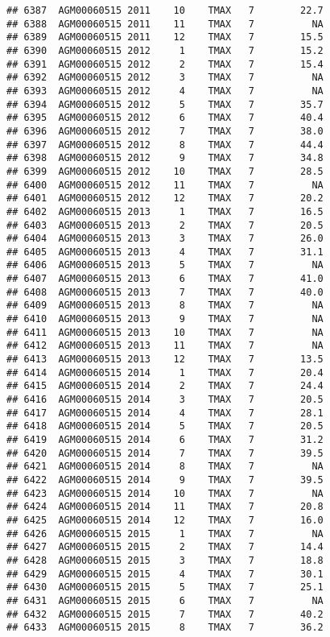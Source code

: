 \documentclass{article}\usepackage[]{graphicx}\usepackage[]{color}
\makeatletter
\newenvironment{kframe}{%
 \def\at@end@of@kframe{}%
 \ifinner\ifhmode%
  \def\at@end@of@kframe{\end{minipage}}%
  \begin{minipage}{\columnwidth}%
 \fi\fi%
 \def\FrameCommand##1{\hskip\@totalleftmargin \hskip-\fboxsep
 \colorbox{shadecolor}{##1}\hskip-\fboxsep
     \hskip-\linewidth \hskip-\@totalleftmargin \hskip\columnwidth}%
 \MakeFramed {\advance\hsize-\width
   \@totalleftmargin\z@ \linewidth\hsize
   \@setminipage}}%
 {\par\unskip\endMakeFramed%
 \at@end@of@kframe}
\newenvironment{knitrout}{}{} %
\makeatother
\begin{document}
\begin{knitrout}
\begin{kframe}
\begin{verbatim}
## 6387  AGM00060515 2011    10    TMAX   7        22.7
## 6388  AGM00060515 2011    11    TMAX   7          NA
## 6389  AGM00060515 2011    12    TMAX   7        15.5
## 6390  AGM00060515 2012     1    TMAX   7        15.2
## 6391  AGM00060515 2012     2    TMAX   7        15.4
## 6392  AGM00060515 2012     3    TMAX   7          NA
## 6393  AGM00060515 2012     4    TMAX   7          NA
## 6394  AGM00060515 2012     5    TMAX   7        35.7
## 6395  AGM00060515 2012     6    TMAX   7        40.4
## 6396  AGM00060515 2012     7    TMAX   7        38.0
## 6397  AGM00060515 2012     8    TMAX   7        44.4
## 6398  AGM00060515 2012     9    TMAX   7        34.8
## 6399  AGM00060515 2012    10    TMAX   7        28.5
## 6400  AGM00060515 2012    11    TMAX   7          NA
## 6401  AGM00060515 2012    12    TMAX   7        20.2
## 6402  AGM00060515 2013     1    TMAX   7        16.5
## 6403  AGM00060515 2013     2    TMAX   7        20.5
## 6404  AGM00060515 2013     3    TMAX   7        26.0
## 6405  AGM00060515 2013     4    TMAX   7        31.1
## 6406  AGM00060515 2013     5    TMAX   7          NA
## 6407  AGM00060515 2013     6    TMAX   7        41.0
## 6408  AGM00060515 2013     7    TMAX   7        40.0
## 6409  AGM00060515 2013     8    TMAX   7          NA
## 6410  AGM00060515 2013     9    TMAX   7          NA
## 6411  AGM00060515 2013    10    TMAX   7          NA
## 6412  AGM00060515 2013    11    TMAX   7          NA
## 6413  AGM00060515 2013    12    TMAX   7        13.5
## 6414  AGM00060515 2014     1    TMAX   7        20.4
## 6415  AGM00060515 2014     2    TMAX   7        24.4
## 6416  AGM00060515 2014     3    TMAX   7        20.5
## 6417  AGM00060515 2014     4    TMAX   7        28.1
## 6418  AGM00060515 2014     5    TMAX   7        20.5
## 6419  AGM00060515 2014     6    TMAX   7        31.2
## 6420  AGM00060515 2014     7    TMAX   7        39.5
## 6421  AGM00060515 2014     8    TMAX   7          NA
## 6422  AGM00060515 2014     9    TMAX   7        39.5
## 6423  AGM00060515 2014    10    TMAX   7          NA
## 6424  AGM00060515 2014    11    TMAX   7        20.8
## 6425  AGM00060515 2014    12    TMAX   7        16.0
## 6426  AGM00060515 2015     1    TMAX   7          NA
## 6427  AGM00060515 2015     2    TMAX   7        14.4
## 6428  AGM00060515 2015     3    TMAX   7        18.8
## 6429  AGM00060515 2015     4    TMAX   7        30.1
## 6430  AGM00060515 2015     5    TMAX   7        25.1
## 6431  AGM00060515 2015     6    TMAX   7          NA
## 6432  AGM00060515 2015     7    TMAX   7        40.2
## 6433  AGM00060515 2015     8    TMAX   7        36.2

\end{verbatim}
\end{kframe}
\end{knitrout}
\end{document}
